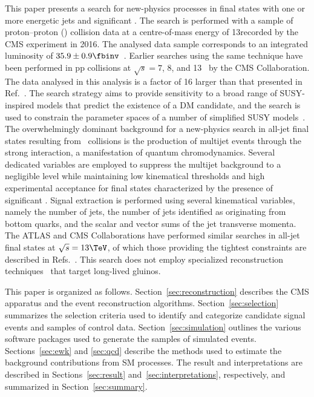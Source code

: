 This paper presents a search for new-physics processes in final states
with one or more energetic jets and significant \ptvecmiss. The search
is performed with a sample of proton--proton (\Pp\Pp) collision data
at a centre-of-mass energy of 13\TeV recorded by the CMS experiment in
2016.  The analysed data sample corresponds to an integrated
luminosity of $35.9 \pm 0.9\fbinv$~\cite{CMS:2017sdi}. Earlier
searches using the same technique have been performed in pp collisions
at $\sqrt{s} = 7$, 8, and 13\TeV~\cite{Khachatryan:2011tk,
  Chatrchyan:2011zy, Chatrchyan:2012wa, Chatrchyan:2013mys,
  Khachatryan:2016pxa, Khachatryan:2016dvc} by the CMS
Collaboration. The data analysed in this analysis is a factor of 16
larger than that presented in Ref.~\cite{Khachatryan:2016dvc}. The
search strategy aims to provide sensitivity to a broad range of
SUSY-inspired models that predict the existence of a DM candidate, and
the search is used to constrain the parameter spaces of a number of
simplified SUSY models~\cite{Alwall:2008ag, Alwall:2008va, sms}. The
overwhelmingly dominant background for a new-physics search in all-jet
final states resulting from \Pp\Pp\ collisions is the production of
multijet events through the strong interaction, a manifestation of
quantum chromodynamics. Several dedicated variables are employed to
suppress the multijet background to a negligible level while
maintaining low kinematical thresholds and high experimental
acceptance for final states characterized by the presence of
significant \ptvecmiss. Signal extraction is performed using several
kinematical variables, namely the number of jets, the number of jets
identified as originating from bottom quarks, and the scalar and
vector sums of the jet transverse momenta. The ATLAS and CMS
Collaborations have performed similar searches in all-jet final states
at $\sqrt{s} = 13\TeV$, of which those providing the tightest
constraints are described in Refs.~\cite{Aaboud:2016zdn,
  Sirunyan:2017cwe, Sirunyan:2017kqq}. This search does not employ
specialized reconstruction techniques~\cite{Aaboud:2017iio,
  Aaboud:2016uth, Aaboud:2016dgf, Aad:2013gva, Khachatryan:2016sfv,
  Khachatryan:2015jha} that target long-lived gluinos.

This paper is organized as follows. Section~\ref{sec:reconstruction}
describes the CMS apparatus and the event reconstruction
algorithms. Section~\ref{sec:selection} summarizes the selection
criteria used to identify and categorize candidate signal events and
samples of control data. Section~\ref{sec:simulation} outlines the
various software packages used to generate the samples of simulated
events. Sections~\ref{sec:ewk} and \ref{sec:qcd} describe the methods
used to estimate the background contributions from SM processes. The
result and interpretations are described in Sections~\ref{sec:result}
and~\ref{sec:interpretations}, respectively, and summarized in
Section~\ref{sec:summary}.

